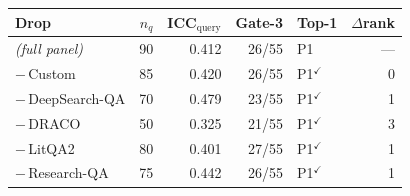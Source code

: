 \begin{tabular}{lrrrlr}
\toprule
Drop & $n_q$ & ICC$_{\mathrm{query}}$ & Gate-3 & Top-1 & $\Delta$rank \\
\midrule
\textit{(full panel)} & 90 & 0.412 & 26/55 & P1 & --- \\
\midrule
$-$\,Custom & 85 & 0.420 & 26/55 & P1$^{\checkmark}$ & 0 \\
$-$\,DeepSearch-QA & 70 & 0.479 & 23/55 & P1$^{\checkmark}$ & 1 \\
$-$\,DRACO & 50 & 0.325 & 21/55 & P1$^{\checkmark}$ & 3 \\
$-$\,LitQA2 & 80 & 0.401 & 27/55 & P1$^{\checkmark}$ & 1 \\
$-$\,Research-QA & 75 & 0.442 & 26/55 & P1$^{\checkmark}$ & 1 \\
\bottomrule
\end{tabular}

